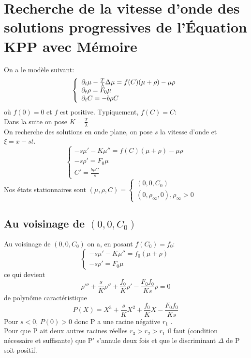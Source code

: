 \documentclass[11pt]{article}
\begin{document}
\fi

\section{Recherche de la vitesse d'onde des solutions progressives de l’Équation KPP avec Mémoire}
On a le modèle suivant: 
\begin{equation} \left\{
                \begin{array}{ll}
                   \partial_t\mu -\frac{T}{\lambda}\Delta\mu = f(C)(\mu + \rho) -\mu\rho\\
                 \partial_t\rho=  F_0 \mu \\
                  \partial_t C = -b\rho C
                \end{array}
              \right.
\end{equation} 
où $f(0)=0$ et $f$ est positive. Typiquement, $f(C)=C$:\\
Dans la suite on pose $K= \frac{T}{\lambda}$\\
On recherche des solutions en onde plane, on pose $s$ la vitesse d'onde et $\xi = x - st$. \\
\begin{equation} \left\{ \begin{array}{ll} -s \mu'-K\mu''=f(C)(\mu+\rho)-\mu\rho \\ -s\rho' = F_0\mu  \\C'=\frac{b\rho C}{s} \end{array}\right.
\end{equation}
Nos états stationnaires sont $(\mu,\rho,C) = \left\{ \begin{array}{ll} (0,0,C_0) \\
 (0,\rho_\infty,0) , \rho_\infty > 0 \end{array} \right.$ 
\subsection{Au voisinage de $(0,0,C_0)$}
Au voisinage de $(0,0,C_0)$ on a, en posant $f(C_0)=f_0$:
\begin{equation} \left\{ \begin{array}{ll} -s \mu'-K\mu''=f_0(\mu+\rho) \\ -s\rho' = F_0\mu   \end{array}\right.
\end{equation} ce qui devient  \begin{equation} \rho''' +\frac{s}{K}\rho''+\frac{f_0}{K}\rho'-\frac{F_0f_0}{Ks}\rho =0 \end{equation} de polynôme caractéristique \begin{equation} P(X)= X^3 +\frac{s}{K}X^2+\frac{f_0}{K}X-\frac{F_0f_0}{Ks} \end{equation}
Pour $s<0$,   $P(0)>0$ donc P a une racine négative $r_1$ .\\
Pour que P ait deux autres racines réelles $r_3>r_2>r_1$ il faut (condition nécessaire et suffisante) que P' s'annule deux fois et que le discriminant $\Delta$ de P soit positif.
\end{document}
